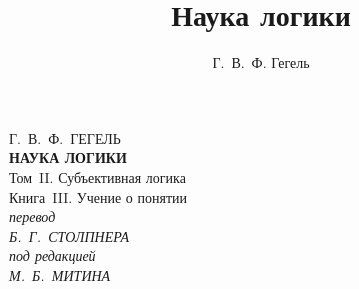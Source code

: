 \documentclass[a5paper, 11pt, twoside, onecolumn, openany]{memoir}
\author{Г.~В.~Ф. Гегель}
\title{Наука логики}
\date{}
\begin{document}
\frontmatter
\pagestyle{empty}

{\centering
  {\Large Г.~В.~Ф.~ГЕГЕЛЬ} \\
  \vspace{130pt}
  \textbf{\Huge НАУКА ЛОГИКИ} \\
  \vspace{60pt}
  {\Large Том~II. Субъективная логика} \\
  \vspace{8pt}
  {\large Книга~III. Учение о понятии} \\
  \vspace{70pt}
  \textit{перевод} \\
  \textit{Б.~Г.~СТОЛПНЕРА} \\
  \vspace{10pt}
  \textit{под редакцией} \\
  \textit{М.~Б.~МИТИНА}
\par}

\clearpage

\mainmatter
\pagestyle{plain}



\backmatter

\clearpage
\tableofcontents*
\clearpage
\end{document}
